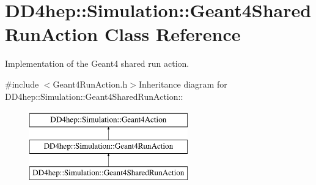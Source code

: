 \hypertarget{class_d_d4hep_1_1_simulation_1_1_geant4_shared_run_action}{
\section{DD4hep::Simulation::Geant4SharedRunAction Class Reference}
\label{class_d_d4hep_1_1_simulation_1_1_geant4_shared_run_action}
}


Implementation of the Geant4 shared run action.  


{\ttfamily \#include $<$Geant4RunAction.h$>$}Inheritance diagram for DD4hep::Simulation::Geant4SharedRunAction::\begin{figure}[H]
\begin{center}
\leavevmode
\includegraphics[height=3cm]{class_d_d4hep_1_1_simulation_1_1_geant4_shared_run_action}
\end{center}
\end{figure}
